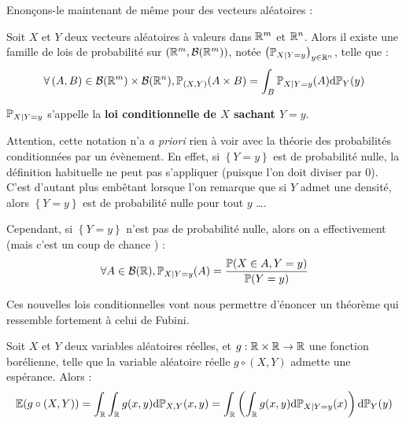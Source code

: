 \documentclass[../integ-proba.tex]{subfiles}
\begin{document}
    Enonçons-le maintenant de même pour des vecteurs aléatoires :

    \begin{thm}
        Soit $X$ et $Y$ deux vecteurs aléatoires à valeurs dans $\mathbb{R}^m$ et $\mathbb{R}^n$.
        Alors il existe une famille de lois de probabilité sur $\left( \mathbb{R}^m, \mathcal{B}(\mathbb{R}^m) \right)$, notée $\left( \mathbb{P}_{X | Y = y} \right)_{y \in \mathbb{R}^n}$, telle que :
        \begin{displaymath}
            \forall \left( A, B \right) \in \mathcal{B}(\mathbb{R}^m) \times \mathcal{B}(\mathbb{R}^n), \mathbb{P}_{\left( X,Y \right)}(A \times B) = \int_B \mathbb{P}_{X | Y = y}(A) \textnormal{d}\mathbb{P}_Y(y)
        \end{displaymath}

        $\mathbb{P}_{X | Y = y}$ s'appelle la \textbf{loi conditionnelle de $X$ sachant $Y = y$}.
    \end{thm}

    \begin{rem}
        \label{rem:warning_cond}
        Attention, cette notation n'a \textit{a priori} rien à voir avec la théorie des probabilités conditionnées par un évènement.
        En effet, si $\left\{ Y = y \right\}$ est de probabilité nulle, la définition habituelle ne peut pas s'appliquer (puisque l'on doit diviser par 0).
        C'est d'autant plus embêtant lorsque l'on remarque que si $Y$ admet une densité, alors $\left\{ Y = y \right\}$ est de probabilité nulle pour tout $y$ \ldots.

        Cependant, si $\left\{ Y = y \right\}$ n'est pas de probabilité nulle, alors on a effectivement (mais c'est un \og coup de chance \fg) :
        \begin{displaymath}
            \forall A \in \mathcal{B}(\mathbb{R}), \mathbb{P}_{X | Y = y}(A) = \dfrac{\mathbb{P}(X \in A, Y = y )}{\mathbb{P}(Y = y)}
        \end{displaymath}
    \end{rem}

    Ces nouvelles lois conditionnelles vont nous permettre d'énoncer un théorème qui ressemble fortement à celui de Fubini.

    \begin{thm}
        Soit $X$ et $Y$ deux variables aléatoires réelles, et $g : \mathbb{R} \times \mathbb{R} \rightarrow \mathbb{R}$ une fonction borélienne, telle que la variable aléatoire réelle $g \circ (X,Y)$ admette une espérance.
        Alors :
        \begin{displaymath}
            \mathbb{E}(g \circ (X,Y)) = \int_{\mathbb{R}} \int_{\mathbb{R}} g(x,y) \textnormal{d} \mathbb{P}_{X,Y} (x,y) = \int_{\mathbb{R}} \left( \int_{\mathbb{R}} g(x,y) \textnormal{d}\mathbb{P}_{X | Y=y} (x) \right) \textnormal{d} \mathbb{P}_Y (y)
        \end{displaymath}
    \end{thm}
\end{document}
